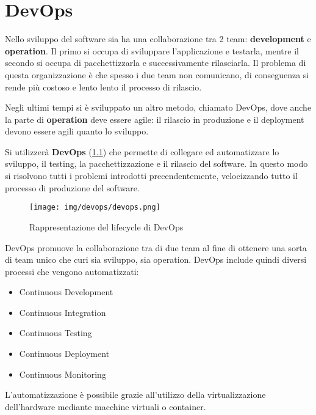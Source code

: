 \chapter{DevOps}
Nello sviluppo del software sia ha una collaborazione tra 2 team: \textbf{development} e
\textbf{operation}. Il primo si occupa di sviluppare l'applicazione e testarla, mentre il
secondo si occupa di pacchettizzarla e successivamente rilasciarla. Il problema
di questa organizzazione è che spesso i due team non comunicano, di conseguenza 
si rende più costoso e lento lento il processo di rilascio.

Negli ultimi tempi si è sviluppato un altro metodo, chiamato DevOps, dove anche
la parte di \textbf{operation} deve essere agile: il rilascio in produzione e il
deployment devono essere agili quanto lo sviluppo.

Si utilizzerà \textbf{DevOps} (\ref{fig:devops}) che permette di collegare ed 
automatizzare lo sviluppo, il testing, la pacchettizzazione e il rilascio del software.
In questo modo si risolvono tutti i problemi introdotti precendentemente, velocizzando
tutto il processo di produzione del software.

\begin{figure}[!ht]
    \centering
    \texttt{[image: img/devops/devops.png]}
    \caption{Rappresentazione del lifecycle di DevOps}
    \label{fig:devops}
\end{figure}

DevOps promuove la collaborazione tra di due team al fine di ottenere una sorta
di team unico che curi sia sviluppo, sia operation. DevOps include quindi diversi
processi che vengono automatizzati:
\begin{itemize}
    \item Continuous Development
    \item Continuous Integration
    \item Continuous Testing
    \item Continuous Deployment
    \item Continuous Monitoring
\end{itemize}
L'automatizzazione è possibile grazie all'utilizzo della virtualizzazione dell'hardware
mediante macchine virtuali o container.

